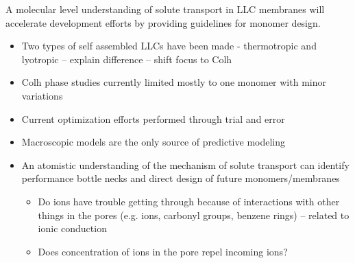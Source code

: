 \documentclass{article}
\begin{document}
        A molecular level understanding of solute transport in LLC membranes will accelerate development efforts by providing guidelines for monomer design.
        \begin{itemize}
                \item Two types of self assembled LLCs have been made - thermotropic and lyotropic -- explain difference -- shift focus to Colh
                \item Colh phase studies currently limited mostly to one monomer with minor variations
                \item Current optimization efforts performed through trial and error
                \item Macroscopic models are the only source of predictive modeling
                \item An atomistic understanding of the mechanism of solute transport can identify
                performance bottle necks and direct design of future monomers/membranes
                \begin{itemize}
                        \item Do ions have trouble getting through because of interactions with other things in the pores (e.g. ions, carbonyl groups, benzene rings) -- related to ionic conduction
                        \item Does concentration of ions in the pore repel incoming ions?
                \end{itemize}
        \end{itemize}
\end{document}

